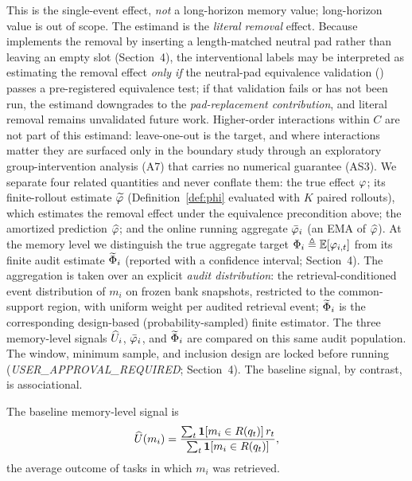 \noindent This is the single-event effect, \emph{not} a long-horizon memory value;
long-horizon value is out of scope. The estimand is the \emph{literal removal}
effect. Because \rit{} implements the removal by inserting a length-matched neutral
pad rather than leaving an empty slot (Section~4), the interventional labels may be
interpreted as estimating the removal effect \emph{only if} the neutral-pad
equivalence validation () passes a pre-registered
equivalence test; if that validation fails or has not been run, the estimand
downgrades to the \emph{pad-replacement contribution}, and literal removal remains
unvalidated future work. Higher-order interactions within $C$ are not part of this
estimand: leave-one-out is the target, and where interactions matter they are
surfaced only in the boundary study through an exploratory group-intervention
analysis (A7) that carries no numerical guarantee (AS3).
We separate four
related quantities and never conflate them: the true effect $\varphi$; its
finite-rollout \rit{} estimate $\widetilde{\varphi}$ (Definition~\ref{def:phi} evaluated with
$K$ paired rollouts), which estimates the removal effect under the equivalence
precondition above; the amortized \aca{} prediction $\widehat{\varphi}$; and the online
running aggregate $\bar{\varphi}_i$ (an EMA of $\widehat{\varphi}$). At the memory level we
distinguish the true aggregate target $\Phi_i \triangleq \mathbb{E}[\varphi_{i,t}]$ from
its finite \rit{} audit estimate $\widetilde{\Phi}_i$ (reported with a confidence
interval; Section~4). The aggregation is taken over an explicit \emph{audit
distribution}: the retrieval-conditioned event distribution of $m_i$ on frozen bank
snapshots, restricted to the common-support region, with uniform weight per audited
retrieval event; $\widetilde{\Phi}_i$ is the corresponding design-based (probability-sampled)
finite estimator. The three memory-level signals $\widehat{U}_i$, $\bar{\varphi}_i$, and
$\widetilde{\Phi}_i$ are compared on this same audit population. The window, minimum sample,
and inclusion design are locked before running (\emph{USER\_APPROVAL\_REQUIRED};
Section~4). The baseline signal, by contrast, is associational.

\begin{definition}\label{def:util}
The baseline memory-level signal is
\begin{equation}
\widehat{U}(m_i) = \frac{\sum_t \mathbf{1}[m_i \in R(q_t)]\, r_t}
                    {\sum_t \mathbf{1}[m_i \in R(q_t)]},
\end{equation}
the average outcome of tasks in which $m_i$ was retrieved.
\end{definition}

